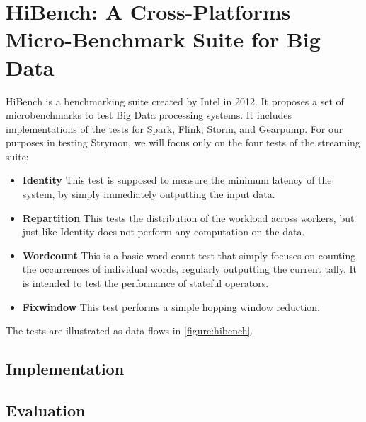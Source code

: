 \section{HiBench: A Cross-Platforms Micro-Benchmark Suite for Big Data\cite{hibench}}
HiBench is a benchmarking suite created by Intel in 2012. It proposes a set of microbenchmarks to test Big Data processing systems. It includes implementations of the tests for Spark, Flink, Storm, and Gearpump. For our purposes in testing Strymon, we will focus only on the four tests of the streaming suite:

\begin{itemize}
\item {\bfseries Identity} This test is supposed to measure the minimum latency of the system, by simply immediately outputting the input data.
\item {\bfseries Repartition} This tests the distribution of the workload across workers, but just like Identity does not perform any computation on the data.
\item {\bfseries Wordcount} This is a basic word count test that simply focuses on counting the occurrences of individual words, regularly outputting the current tally. It is intended to test the performance of stateful operators.
\item {\bfseries Fixwindow} This test performs a simple hopping window reduction.
\end{itemize}

The tests are illustrated as data flows in \autoref{figure:hibench}.


\subsection{Implementation}


\subsection{Evaluation}


